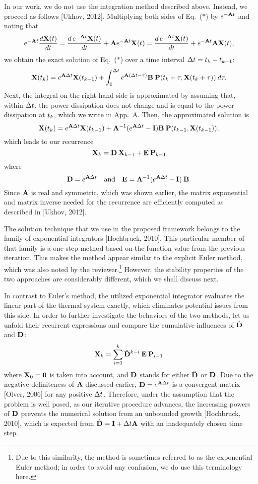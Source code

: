 \begin{authors}
In our work, we do not use the integration method described above.
Instead, we proceed as follows [Ukhov, 2012].
Multiplying both sides of Eq.~($\ast$) by $e^{- \mA \t}$ and noting that
\[
  e^{-\mA \t} \frac{d\vX(\t)}{d\t} = \frac{d\, e^{-\mA \t} \vX(\t)}{d\t} + \mA e^{-\mA \t} \vX(\t) = \frac{d\, e^{-\mA \t} \vX(\t)}{d\t} + e^{-\mA \t} \mA \vX(\t),
\]
we obtain the exact solution of Eq.~($\ast$) over a time interval $\Delta t = t_k - t_{k - 1}$:
\[
  \vX(\t_k) = e^{\mA \Delta \t} \vX(\t_{k - 1}) + \int_0^{\Delta \t} e^{\mA (\Delta t - \tau)} \mB \: \vP(\t_k + \tau, \vX(\t_k + \tau)) \: d\tau.
\]
Next, the integral on the right-hand side is approximated by assuming that, within $\Delta t$, the power dissipation does not change and is equal to the power dissipation at $t_k$, which we write in App.~A.
Then, the approximated solution is
\[
  \vX(\t_k) = e^{\mA \Delta \t} \vX(\t_{k - 1}) + \mA^{-1}(e^{\mA \Delta \t} - \mI) \mB \: \vP(\t_{k - 1}, \vX(\t_{k - 1})),
\]
which leads to our recurrence
\[
  \vX_k = \mCF \: \vX_{k - 1} + \mCS \: \vP_{k - 1}
\]
where
\[
  \mCF = e^{\mA \Delta t} \hspace{1em} \text{and} \hspace{1em} \mCS = \mA^{-1} (e^{\mA \Delta \t} - \mI) \: \mB.
\]
Since $\mA$ is real and symmetric, which was shown earlier, the matrix exponential and matrix inverse needed for the recurrence are efficiently computed as described in [Ukhov, 2012].

The solution technique that we use in the proposed framework belongs to the family of exponential integrators [Hochbruck, 2010].
This particular member of that family is a one-step method based on the function value from the previous iteration.
This makes the method appear similar to the explicit Euler method, which was also noted by the reviewer.\footnote{Due to this similarity, the method is sometimes referred to as the exponential Euler method; in order to avoid any confusion, we do use this terminology here.}
However, the stability properties of the two approaches are considerably different, which we shall discuss next.

In contrast to Euler's method, the utilized exponential integrator evaluates the linear part of the thermal system exactly, which eliminates potential issues from this side.
In order to further investigate the behaviors of the two methods, let us unfold their recurrent expressions and compare the cumulative influences of $\hat{\mCF}$ and $\mCF$:
\[
  \vX_k = \sum_{i = 1}^k \tilde{\mCF}^{k - i} \: \mCS \: \vP_{i - 1}
\]
where $\vX_0 = \mZero$ is taken into account, and $\tilde{\mCF}$ stands for either $\hat{\mCF}$ or $\mCF$.
Due to the negative-definiteness of $\mA$ discussed earlier, $\mCF = e^{\mA \Delta \t}$ is a convergent matrix [Olver, 2006] for any positive $\Delta t$.
Therefore, under the assumption that the problem is well posed, as our iterative procedure advances, the increasing powers of $\mCF$ prevents the numerical solution from an unbounded growth [Hochbruck, 2010], which is expected from $\hat{\mCF} = \mI + \Delta \t \mA$ with an inadequately chosen time step.


\end{authors}
